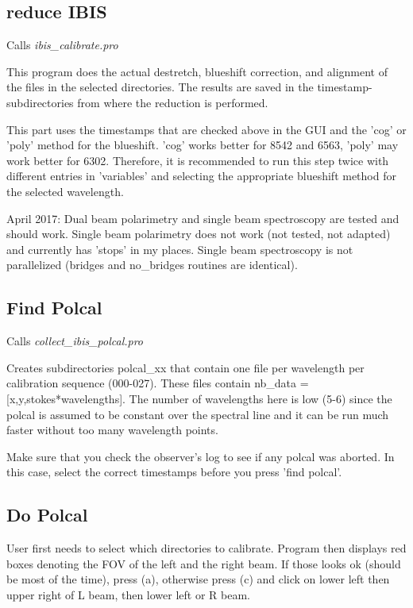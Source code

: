 \documentclass[a4paper,11pt]{article}
\begin{document}
\subsection{reduce IBIS}
Calls \textit{ibis\_calibrate.pro}

This program does the actual destretch, blueshift correction, and
alignment of the files in the selected directories. The results are
saved in the timestamp-subdirectories from where the reduction is performed.

This part uses the timestamps that are checked above in the GUI and the 'cog' or 'poly' method for the blueshift. 'cog' works better for 8542 and 6563, 'poly' may work better for 6302. Therefore, it is recommended to run this step twice with different entries in 'variables' and selecting the appropriate blueshift method for the selected wavelength.

April 2017: Dual beam polarimetry and single beam spectroscopy are tested and should work. Single beam polarimetry does not work (not tested, not adapted) and currently has 'stops' in my places. Single beam spectroscopy is not parallelized (bridges and no\_bridges routines are identical).

\subsection{Find Polcal}
Calls \textit{collect\_ibis\_polcal.pro}

Creates subdirectories polcal\_xx that contain one file per wavelength per calibration sequence (000-027). These files contain nb\_data = [x,y,stokes*wavelengths]. The number of wavelengths here is low (5-6) since the polcal is assumed to be constant over the spectral line and it can be run much faster without too many wavelength points.

Make sure that you check the observer's log to see if any polcal was
aborted. In this case, select the correct timestamps
before you press 'find polcal'.

\subsection{Do Polcal}
\label{sec:polcal}
User first needs to select which directories to calibrate. Program then displays red boxes denoting the FOV of the left and the right beam. If those looks ok (should be most of the time), press (a), otherwise press (c) and click on lower left then upper right of L beam, then lower left or R beam.
\end{document}
